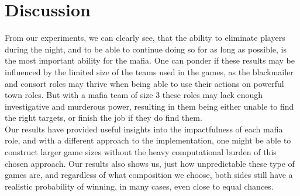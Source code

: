 \section{Discussion}\label{sec:discussion}
From our experiments, we can clearly see, that the ability to eliminate players during the
night, and to be able to continue doing so for as long as possible, is the most
important ability for the mafia. One can ponder if these results may be
influenced by the limited size of the teams used in the games, as the
blackmailer and consort roles may thrive when being able to use their actions
on powerful town roles. But with a mafia team of size 3 these roles may lack
enough investigative and murderous power, resulting in them being either unable
to find the right targets, or finish the job if they do find them.\\ Our
results have provided useful insights into the impactfulness of each mafia
role, and with a different approach to the implementation, one might be able to
construct larger game sizes without the heavy computational burden of this
chosen approach. Our results also shows us, just how unpredictable these type
of games are, and regardless of what composition we choose, both sides still
have a realistic probability of winning, in many cases, even close to equal
chances.

